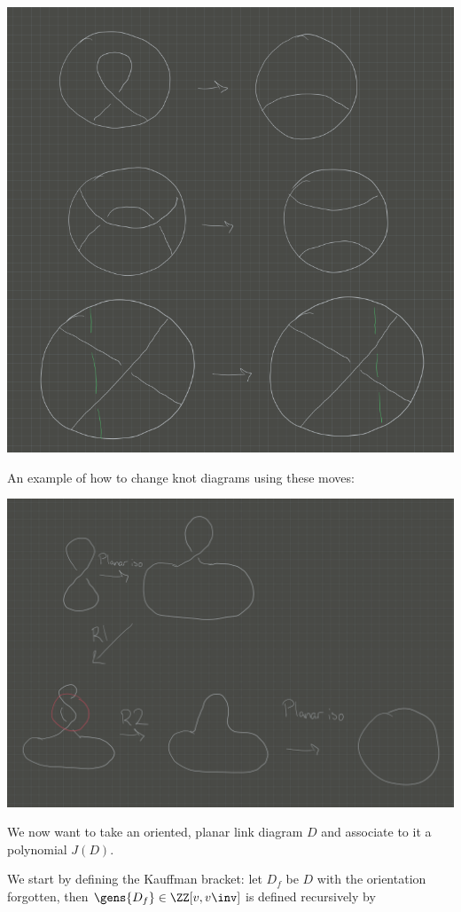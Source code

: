 \includegraphics{figures/image_2020-07-06-11-31-38.png}

An example of how to change knot diagrams using these moves:

\includegraphics{figures/image_2020-07-06-11-35-44.png}

We now want to take an oriented, planar link diagram \(D\) and associate
to it a polynomial \(J(D)\).

We start by defining the Kauffman bracket: let \(D_f\) be \(D\) with the
orientation forgotten, then \(\gens{D_f} \in \ZZ[v, v\inv]\) is defined
recursively by

